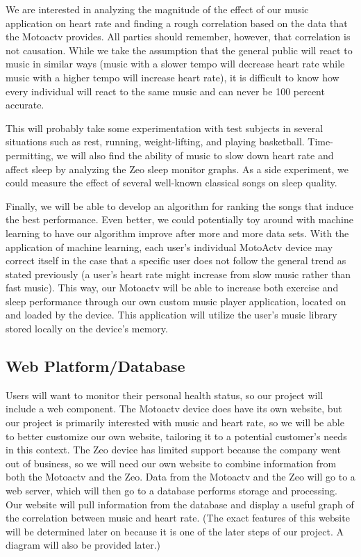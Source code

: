 \documentclass[letterpaper,english, 12pt]{scrreprt}
\begin{document}
We are interested in analyzing the magnitude of the effect of our music application on heart rate and finding a rough correlation based on the data that the Motoactv provides. All parties should remember, however, that correlation is not causation. While we take the assumption that the general public will react to music in similar ways (music with a slower tempo will decrease heart rate while music with a higher tempo will increase heart rate), it is difficult to know how every individual will react to the same music and can never be 100 percent accurate.

This will probably take some experimentation with test subjects in several situations such as rest, running, weight-lifting, and playing basketball. Time-permitting, we will also find the ability of music to slow down heart rate and affect sleep by analyzing the Zeo sleep monitor graphs. As a side experiment, we could measure the effect of several well-known classical songs on sleep quality.
			 
Finally, we will be able to develop an algorithm for ranking the songs that induce the best performance. Even better, we could potentially toy around with machine learning to have our algorithm improve after more and more data sets. With the application of machine learning, each user's individual MotoActv device may correct itself in the case that a specific user does not follow the general trend as stated previously (a user's heart rate might increase from slow music rather than fast music). This way, our Motoactv will be able to increase both exercise and sleep performance through our own custom music player application, located on and loaded by the device. This application will utilize the user's music library stored locally on the device's memory.

\subsection{Web Platform/Database}
Users will want to monitor their personal health status, so our project will include a web component. The Motoactv device does have its own website, but our project is primarily interested with music and heart rate, so we will be able to better customize our own website, tailoring it to a potential customer's needs in this context. The Zeo device has limited support because the company went out of business, so we will need our own website to combine information from both the Motoactv and the Zeo. Data from the Motoactv and the Zeo will go to a web server, which will then go to a database performs storage and processing. Our website will pull information from the database and display a useful graph of the correlation between music and heart rate. (The exact features of this website will be determined later on because it is one of the later steps of our project. A diagram will also be provided later.)
\end{document}

